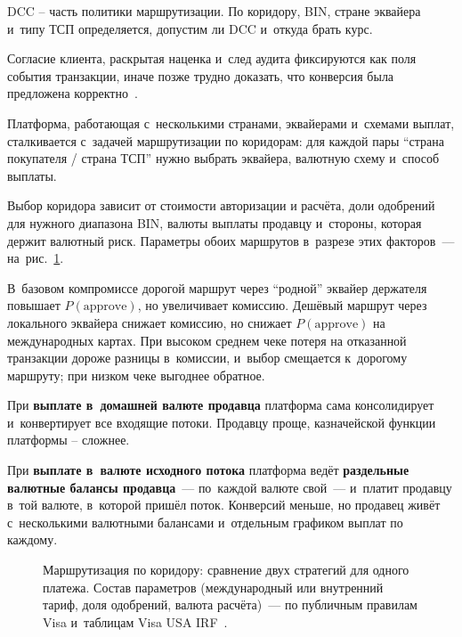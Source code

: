 DCC -- часть политики маршрутизации. По коридору, BIN,
стране эквайера и~типу ТСП определяется, допустим ли DCC
и~откуда брать курс.

Согласие клиента, раскрытая наценка и~след аудита фиксируются
как поля события транзакции, иначе позже трудно доказать,
что конверсия была предложена корректно~\cite{visa-core-rules,mc-tpr}.

Платформа, работающая с~несколькими странами, эквайерами
и~схемами выплат, сталкивается с~задачей маршрутизации
по коридорам: для каждой пары \enquote{страна покупателя
/ страна ТСП} нужно выбрать эквайера, валютную схему
и~способ выплаты.

Выбор коридора зависит от стоимости авторизации и расчёта,
доли одобрений для нужного диапазона BIN, валюты выплаты
продавцу и~стороны, которая держит валютный риск. Параметры обоих маршрутов в~разрезе этих факторов~--- на~рис.~\ref{fig:corridor-routing}.

В~базовом компромиссе дорогой маршрут через \enquote{родной}
эквайер держателя повышает \(P(\text{approve})\), но
увеличивает комиссию. Дешёвый маршрут через локального
эквайера снижает комиссию, но снижает \(P(\text{approve})\)
на международных картах. При высоком среднем чеке потеря
на отказанной транзакции дороже разницы в~комиссии,
и~выбор смещается к~дорогому маршруту; при
низком чеке выгоднее обратное.

При \textbf{выплате в~домашней валюте продавца} платформа сама
консолидирует и~конвертирует все входящие потоки. Продавцу
проще, казначейской функции платформы -- сложнее.

При \textbf{выплате в~валюте исходного потока} платформа ведёт
\textbf{раздельные валютные балансы продавца}~--- по~каждой валюте
свой~--- и~платит продавцу в~той валюте, в~которой пришёл поток. Конверсий
меньше, но продавец живёт с~несколькими валютными балансами
и~отдельным графиком выплат по каждому.

\begin{figure}[tbp]
  \centering
  \caption{Маршрутизация по коридору: сравнение двух стратегий для одного платежа. Состав параметров (международный или внутренний тариф, доля одобрений, валюта расчёта)~--- по публичным правилам Visa и~таблицам Visa USA IRF~\cite{visa-core-rules,visa-interchange}.}\label{fig:corridor-routing}
\end{figure}

